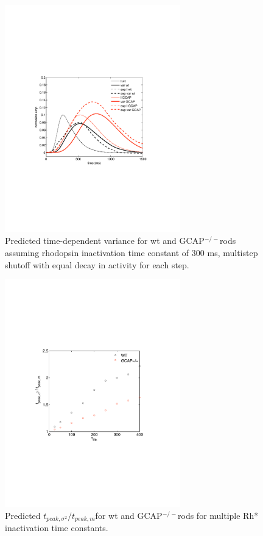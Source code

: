 \documentclass[12pt]{article}
\def\GCAPKO{GCAP$^{-/-}$}
\def\tpeakratio{$t_{peak, \sigma^2} / t_{peak, m}$}
\begin{document}
\begin{figure}[h!]
\begin{center}
\includegraphics[width=3in]{GCAPKOFullKinetics.pdf}
\caption{Predicted time-dependent variance for wt and \GCAPKO rods assuming rhodopsin inactivation time constant of 300 ms, multistep shutoff with equal decay in activity for each step.}
\label{fig:GCAPFull}
\end{center}
\end{figure}

\begin{figure}[h!]
\begin{center}
\includegraphics[width=3in]{GCAPKOKinetics.pdf}
\caption{Predicted \tpeakratio for wt and \GCAPKO rods for multiple Rh* inactivation time constants.}
\label{fig:GCAP}
\end{center}
\end{figure}
\end{document}
